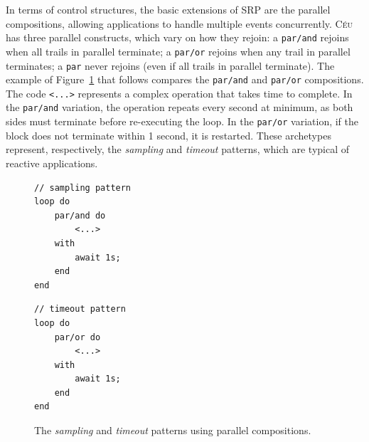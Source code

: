 \documentclass{acm_proc_article-sp}
\newcommand{\CEU}{\textsc{C\'{e}u}\xspace}
\newcommand{\code}[1] {{\small{\texttt{#1}}}}
\newcommand{\1}{\;}
\newcommand{\2}{\;\;}
\newcommand{\3}{\;\;\;}
\newcommand{\5}{\;\;\;\;\;}
\begin{document}
In terms of control structures, the basic extensions of SRP are the parallel 
compositions, allowing applications to handle multiple events concurrently.
%
\CEU has three parallel constructs, which vary on how they rejoin:
a \code{par/and} rejoins when all trails in parallel terminate;
a \code{par/or} rejoins when any trail in parallel terminates;
a \code{par} never rejoins (even if all trails in parallel terminate).
%
The example of Figure~\ref{lst.patts} that follows compares the \code{par/and} 
and \code{par/or} compositions.
%
The code \code{<...>} represents a complex operation that takes time to 
complete.
%
In the \code{par/and} variation, the operation repeats every second at minimum, 
as both sides must terminate before re-executing the loop.
In the \code{par/or} variation, if the block does not terminate within 1 
second, it is restarted.
%
These archetypes represent, respectively, the \emph{sampling} and 
\emph{timeout} patterns, which are typical of reactive applications.

\begin{figure}[t]
\begin{minipage}[t]{0.40\linewidth}
\begin{lstlisting}
// sampling pattern
loop do
    par/and do
        <...>
    with
        await 1s;
    end
end
\end{lstlisting}
\end{minipage}
%
\begin{minipage}[t]{0.40\linewidth}
\begin{lstlisting}
// timeout pattern
loop do
    par/or do
        <...>
    with
        await 1s;
    end
end
\end{lstlisting}
\end{minipage}
\caption{ The \emph{sampling} and \emph{timeout} patterns using parallel 
compositions.
\label{lst.patts}
}
\end{figure}
\end{document}
